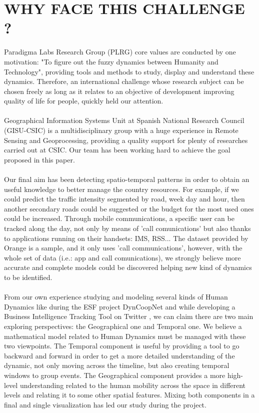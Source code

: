 \newpage

\section{WHY FACE THIS CHALLENGE ?}
Paradigma Labs Research Group (PLRG) core values are conducted by one motivation: "To figure out the fuzzy dynamics between Humanity and Technology", providing tools and methods to study, display and understand these dynamics. Therefore, an international challenge whose research subject can be chosen freely as long as it relates to an objective of development improving quality of life for people, quickly held our attention.
\\
\\
Geographical Information Systems Unit at Spanish National Research Council (GISU-CSIC) is a multidisciplinary group with a huge experience in Remote Sensing and Geoprocessing, providing a quality support for plenty of researches carried out at CSIC. Our team has been working hard to achieve the goal proposed in this paper.
\\
\\
Our final aim has been detecting spatio-temporal patterns in order to obtain an useful knowledge to better manage the country resources. For example, if we could predict the traffic intensity segmented by road, week day and hour, then another secondary roads could be suggested or the budget for the most used ones could be increased. Through mobile communications, a specific user can be tracked along the day, not only by means of 'call comunications' but also thanks to applications running on their handsets: IMS, RSS... The dataset provided by Orange is a sample, and it only uses 'call communications', however, with the whole set of data (i.e.: app and call comunications), we strongly believe more accurate and complete models could be discovered helping new kind of dynamics to be identified.
\\
\\
From our own experience studying and modeling several kinds of Human Dynamics like during the ESF project DynCoopNet\citep{dyncoopnet2012} and while developing a Business Intelligence Tracking Tool on Twitter \citep{labselecciones}, we can claim there are two main exploring perspectives: the Geographical one and Temporal one. We believe a mathematical model related to Human Dynamics must be managed with these two viewpoints. The Temporal component is useful by providing a tool to go backward and forward in order to get a more detailed understanding of the dynamic, not only moving across the timeline, but also creating temporal windows to group events. The Geographical component provides a more high-level understanding related to the human mobility across the space in different levels and relating it to some other spatial features. Mixing both components in a final and single visualization has led our study during the project.
